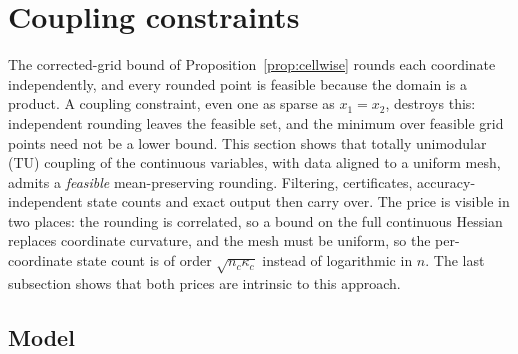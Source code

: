 \section{Coupling constraints}\label{sec:constraints}

The corrected-grid bound of Proposition~\ref{prop:cellwise} rounds each coordinate
independently, and every rounded point is feasible because the domain is a
product. A coupling constraint, even one as sparse as $x_1=x_2$, destroys
this: independent rounding leaves the feasible set, and the minimum over
feasible grid points need not be a lower bound. This section shows that
totally unimodular (TU) coupling of the continuous variables, with data
aligned to a uniform mesh, admits a \emph{feasible} mean-preserving rounding.
Filtering, certificates, accuracy-independent state counts and exact output
then carry over. The price is visible in two places: the rounding is
correlated, so a bound on the full continuous Hessian replaces coordinate
curvature, and the mesh must be uniform, so the per-coordinate state count is
of order $\sqrt{n_c\kappa_c}$ instead of logarithmic in $n$. The last
subsection shows that both prices are intrinsic to this approach.

\subsection{Model}\label{sec:tu-model}

